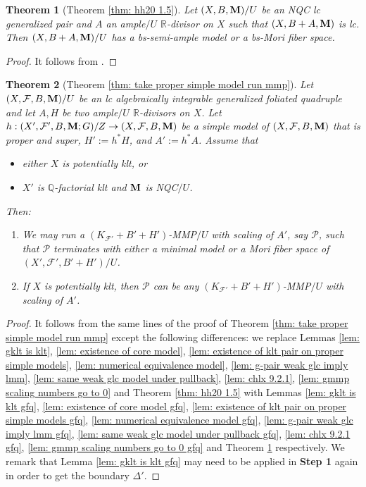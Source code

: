 \documentclass[11pt]{amsart}
\numberwithin{equation}{section}
\newcommand{\Mm}{{\bf{M}}}
\newcommand{\Qq}{\mathbb{Q}}
\newcommand{\Rr}{\mathbb{R}}
\newcommand{\Ff}{\mathcal{F}}
\newtheorem{thm}{Theorem}[section]
\theoremstyle{definition}
\theoremstyle{definition}
\theoremstyle{definition}
\begin{document}
\begin{thm}[Theorem \ref{thm: hh20 1.5}]\label{thm: hh20 1.5 gfq}
    Let $(X,B,\Mm)/U$ be an NQC lc generalized pair and $A$ an ample$/U$ $\Rr$-divisor on $X$ such that $(X,B+A,\Mm)$ is lc. Then $(X,B+A,\Mm)/U$ has a bs-semi-ample model or a bs-Mori fiber space.
\end{thm}
\begin{proof}
    It follows from \cite[Theorems A,F]{TX23}.
\end{proof}


\begin{thm}[Theorem \ref{thm: take proper simple model run mmp}]\label{thm: take proper simple model run mmp gfq}
    Let $(X,\Ff,B,\Mm)/U$ be an lc algebraically integrable generalized foliated quadruple and let $A,H$ be two ample$/U$ $\Rr$-divisors on $X$. Let $h: (X',\Ff',B,\Mm;G)/Z\rightarrow (X,\Ff,B,\Mm)$ be a simple model of $(X,\Ff,B,\Mm)$ that is proper and super, $H':=h^*H$, and $A':=h^*A$. Assume that
    \begin{itemize}
        \item either $X$ is potentially klt, or
        \item $X'$ is $\Qq$-factorial klt and $\Mm$ is NQC$/U$.
    \end{itemize}
    Then:
    \begin{enumerate}
        \item We may run a $(K_{\Ff'}+B'+H')$-MMP$/U$ with scaling of $A'$, say $\mathcal{P}$, such that $\mathcal{P}$ terminates with either a minimal model or a Mori fiber space of $(X',\Ff',B'+H')/U$.
        \item If $X$ is potentially klt, then $\mathcal{P}$ can be any $(K_{\Ff'}+B'+H')$-MMP$/U$ with scaling of $A'$.
    \end{enumerate}
\end{thm}
\begin{proof}
     It follows from the same lines of the proof of Theorem \ref{thm: take proper simple model run mmp} except the following differences: we replace Lemmas \ref{lem: gklt is klt}, \ref{lem: existence of core model}, \ref{lem: existence of klt pair on proper simple models}, \ref{lem: numerical equivalence model}, \ref{lem: g-pair weak glc imply lmm}, \ref{lem: same weak glc model under pullback}, \ref{lem: chlx 9.2.1}, \ref{lem: gmmp scaling numbers go to 0} and Theorem \ref{thm: hh20 1.5} with  Lemmas \ref{lem: gklt is klt gfq}, \ref{lem: existence of core model gfq}, \ref{lem: existence of klt pair on proper simple models gfq}, \ref{lem: numerical equivalence model gfq}, \ref{lem: g-pair weak glc imply lmm gfq}, \ref{lem: same weak glc model under pullback gfq}, \ref{lem: chlx 9.2.1 gfq}, \ref{lem: gmmp scaling numbers go to 0 gfq} and Theorem \ref{thm: hh20 1.5 gfq} respectively. We remark that  Lemma \ref{lem: gklt is klt gfq} may need to be applied in \textbf{Step 1} again in order to get the boundary $\Delta'$.
\end{proof}
\end{document}
